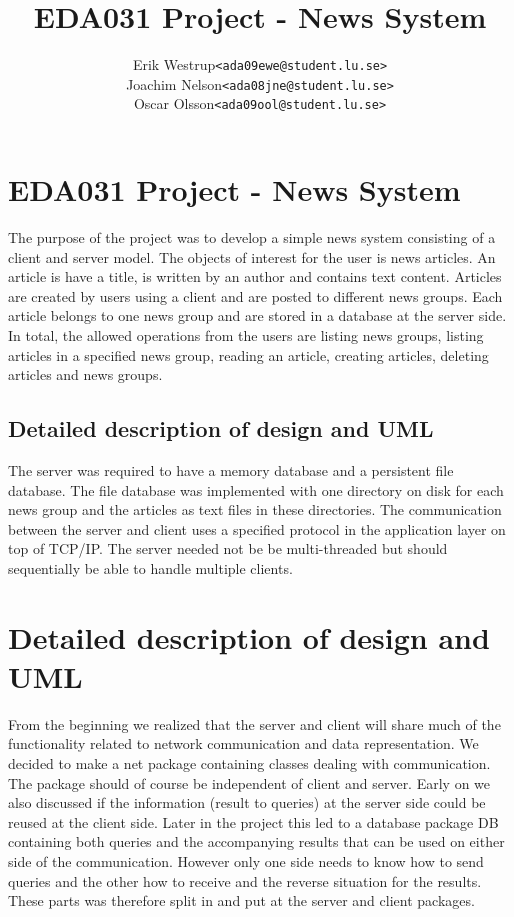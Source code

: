 \documentclass[10pt, a4paper]{article}
\title{EDA031 Project - News System}
\author{
	\begin{tabular}{l l}
		Erik Westrup & \texttt{<ada09ewe@student.lu.se>}\\
		Joachim Nelson & \texttt{<ada08jne@student.lu.se>} \\ %
		Oscar Olsson & \texttt{<ada09ool@student.lu.se>}
	\end{tabular}
}
\begin{document}
\begin{titlepage}
\maketitle
\thispagestyle{empty}	%
\end{titlepage}

\section{EDA031 Project - News System}
The purpose of the project was to develop a simple news system consisting of a client and server model. The objects of interest for the user is news articles. An article is have a title, is written by an author and contains text content. Articles are created by users using a client and are posted to different news groups. Each article belongs to one news group and are stored in a database at the server side. In total, the allowed operations from the users are listing news groups, listing articles in a specified news group, reading an article, creating articles, deleting articles and news groups.

\subsection{Detailed description of design and UML}

The server was required to have a memory database and a persistent file database. The file database was implemented with one directory on disk for each news group and the articles as text files in these directories. The communication between the server and client uses a specified protocol in the application layer on top of TCP/IP. The server needed not be be multi-threaded but should sequentially be able to handle multiple clients.

\section{Detailed description of design and UML}
From the beginning we realized that the server and client will share much of the functionality related to network communication and data representation. We decided to make a net package containing classes dealing with communication. The package should of course be independent of client and server. Early on we also discussed if the information (result to queries)  at the server side could be reused at the client side. Later in the project this led to a database package DB containing both queries and the accompanying results that can be used on either side of the communication. However only one side needs to know how to send queries and the other how to receive and the reverse situation for the results. These parts was therefore split in and put at the server and client packages.
\end{document}
